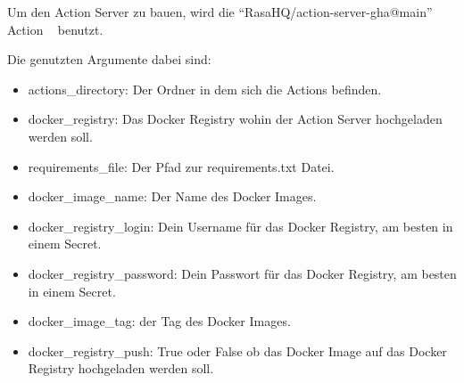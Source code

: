 Um den Action Server zu bauen, wird die ``RasaHQ/action-server-gha@main'' Action ~\cite{actionServerAction} benutzt.

Die genutzten Argumente dabei sind:


\begin{itemize}
    \item actions\_directory: Der Ordner in dem sich die Actions befinden.
    \item docker\_registry: Das Docker Registry wohin der Action Server hochgeladen werden soll.
    \item requirements\_file: Der Pfad zur requirements.txt Datei.
    \item docker\_image\_name: Der Name des Docker Images.
    \item docker\_registry\_login: Dein Username für das Docker Registry, am besten in einem Secret.
    \item docker\_registry\_password: Dein Passwort für das Docker Registry, am besten in einem Secret.
    \item docker\_image\_tag: der Tag des Docker Images.
    \item docker\_registry\_push: True oder False ob das Docker Image auf das Docker Registry hochgeladen werden soll.
\end{itemize}

